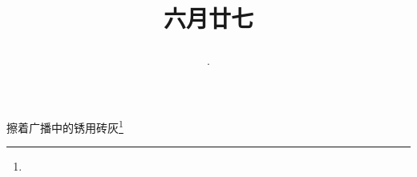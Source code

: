 \title{\date[d=1,m=8,y=2024][year:cn-y,年,month:cn,day:cn,日,·,weekday]·六月廿七 }
擦着广播中的锈用砖灰\footnote{ }

